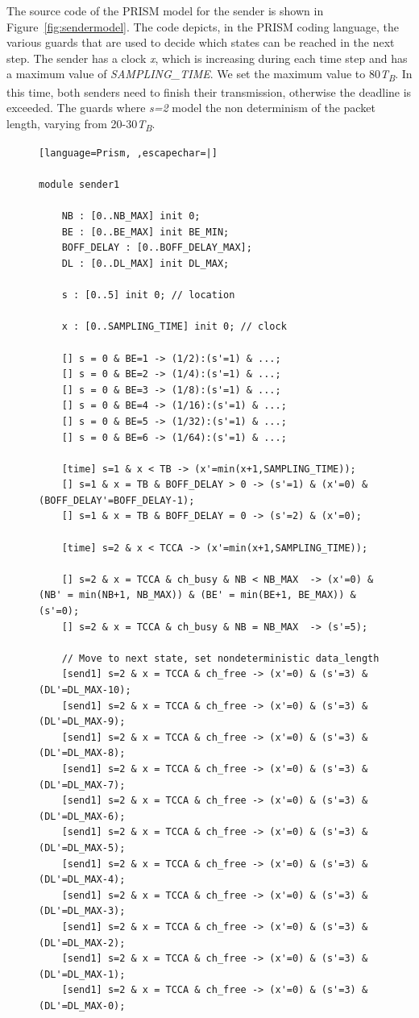 \documentclass[
a4paper,
12pt
]{scrartcl}
\begin{document}
The source code of the PRISM model for the sender is shown in Figure~\ref{fig:sendermodel}. The code depicts, in the PRISM coding language, the various guards that are used to decide which states can be reached in the next step. The sender has a clock \textit{x}, which is increasing during each time step and has a maximum value of \textit{SAMPLING\_TIME}. We set the maximum value to 80\textit{T\textsubscript{B}}. In this time, both senders need to finish their transmission, otherwise the deadline is exceeded. The guards where \textit{s=2} model the non determinism of the packet length, varying from 20-30\textit{T\textsubscript{B}}.

\begin{figure}[H]
\begin{lstlisting}[language=Prism, ,escapechar=|]

module sender1

	NB : [0..NB_MAX] init 0;
	BE : [0..BE_MAX] init BE_MIN;
	BOFF_DELAY : [0..BOFF_DELAY_MAX];
	DL : [0..DL_MAX] init DL_MAX;

	s : [0..5] init 0; // location

	x : [0..SAMPLING_TIME] init 0; // clock

	[] s = 0 & BE=1 -> (1/2):(s'=1) & ...;
	[] s = 0 & BE=2 -> (1/4):(s'=1) & ...;
	[] s = 0 & BE=3 -> (1/8):(s'=1) & ...;
	[] s = 0 & BE=4 -> (1/16):(s'=1) & ...;
	[] s = 0 & BE=5 -> (1/32):(s'=1) & ...;
	[] s = 0 & BE=6 -> (1/64):(s'=1) & ...;

	[time] s=1 & x < TB -> (x'=min(x+1,SAMPLING_TIME));
	[] s=1 & x = TB & BOFF_DELAY > 0 -> (s'=1) & (x'=0) & (BOFF_DELAY'=BOFF_DELAY-1);
	[] s=1 & x = TB & BOFF_DELAY = 0 -> (s'=2) & (x'=0);

	[time] s=2 & x < TCCA -> (x'=min(x+1,SAMPLING_TIME));
	
	[] s=2 & x = TCCA & ch_busy & NB < NB_MAX  -> (x'=0) & (NB' = min(NB+1, NB_MAX)) & (BE' = min(BE+1, BE_MAX)) & (s'=0);
	[] s=2 & x = TCCA & ch_busy & NB = NB_MAX  -> (s'=5);

	// Move to next state, set nondeterministic data_length
	[send1] s=2 & x = TCCA & ch_free -> (x'=0) & (s'=3) & (DL'=DL_MAX-10);
	[send1] s=2 & x = TCCA & ch_free -> (x'=0) & (s'=3) & (DL'=DL_MAX-9);
	[send1] s=2 & x = TCCA & ch_free -> (x'=0) & (s'=3) & (DL'=DL_MAX-8);
	[send1] s=2 & x = TCCA & ch_free -> (x'=0) & (s'=3) & (DL'=DL_MAX-7);
	[send1] s=2 & x = TCCA & ch_free -> (x'=0) & (s'=3) & (DL'=DL_MAX-6);
	[send1] s=2 & x = TCCA & ch_free -> (x'=0) & (s'=3) & (DL'=DL_MAX-5);
	[send1] s=2 & x = TCCA & ch_free -> (x'=0) & (s'=3) & (DL'=DL_MAX-4);
	[send1] s=2 & x = TCCA & ch_free -> (x'=0) & (s'=3) & (DL'=DL_MAX-3);
	[send1] s=2 & x = TCCA & ch_free -> (x'=0) & (s'=3) & (DL'=DL_MAX-2);
	[send1] s=2 & x = TCCA & ch_free -> (x'=0) & (s'=3) & (DL'=DL_MAX-1);
	[send1] s=2 & x = TCCA & ch_free -> (x'=0) & (s'=3) & (DL'=DL_MAX-0);


\end{lstlisting}
\end{figure}
\end{document}
